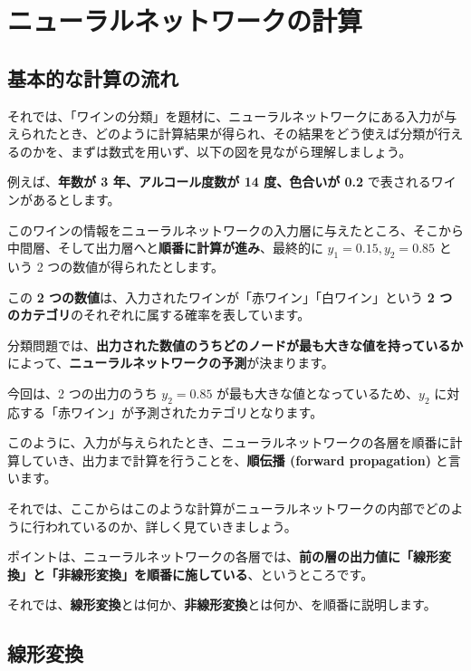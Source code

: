 \section{ニューラルネットワークの計算}


\subsection{基本的な計算の流れ}


それでは、「ワインの分類」を題材に、ニューラルネットワークにある入力が与えられたとき、どのように計算結果が得られ、その結果をどう使えば分類が行えるのかを、まずは数式を用いず、以下の図を見ながら理解しましょう。




例えば、\textbf{年数が 3 年、アルコール度数が 14 度、色合いが 0.2} で表されるワインがあるとします。


このワインの情報をニューラルネットワークの入力層に与えたところ、そこから中間層、そして出力層へと\textbf{順番に計算が進み}、最終的に $y_1 = 0.15, y_2= 0.85$ という 2 つの数値が得られたとします。


この \textbf{2 つの数値}は、入力されたワインが「赤ワイン」「白ワイン」という \textbf{2 つのカテゴリ}のそれぞれに属する確率を表しています。

分類問題では、\textbf{出力された数値のうちどのノードが最も大きな値を持っているか}によって、\textbf{ニューラルネットワークの予測}が決まります。

今回は、2 つの出力のうち $y_{2}=0.85$ が最も大きな値となっているため、$y_2$ に対応する「赤ワイン」が予測されたカテゴリとなります。


このように、入力が与えられたとき、ニューラルネットワークの各層を順番に計算していき、出力まで計算を行うことを、\textbf{順伝播 (forward propagation)} と言います。


それでは、ここからはこのような計算がニューラルネットワークの内部でどのように行われているのか、詳しく見ていきましょう。

ポイントは、ニューラルネットワークの各層では、\textbf{前の層の出力値に「線形変換」と「非線形変換」を順番に施している}、というところです。

それでは、\textbf{線形変換}とは何か、\textbf{非線形変換}とは何か、を順番に説明します。


\subsection{線形変換}



